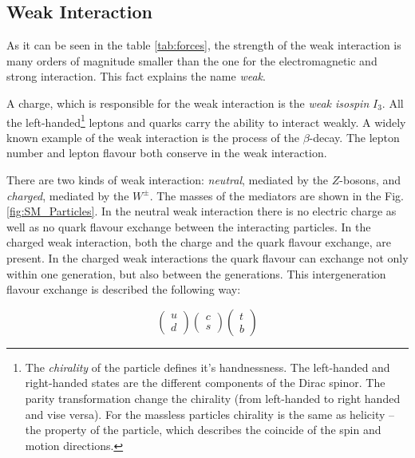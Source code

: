 \subsection{Weak Interaction}

As it can be seen in the table \ref{tab:forces}, the strength of the weak interaction is many orders of magnitude smaller than the one for the 
electromagnetic and strong interaction. This fact explains the name \textit{weak}.

A charge, which is responsible for the weak interaction is the \textit{weak isospin} $I_{3}$.
All the left-handed\footnote{The \textit{chirality} of the particle defines it's handnessness.
The left-handed and right-handed states are the different components of the Dirac spinor\cite{aitchison2003gauge}. The parity transformation change the chirality (from
left-handed to right handed and vise versa). For the massless particles chirality is the same as helicity -- the property of the particle, which describes the coincide
of the spin and motion directions.} leptons and quarks carry the ability to interact weakly.
A widely known example of the weak interaction is the process of the $\beta$-decay. The lepton number and lepton flavour both conserve in the weak interaction.

There are two kinds of weak interaction: \textit{neutral}, mediated by the 
$Z$-bosons, and \textit{charged}, mediated by the $W^{\pm}$. The masses of the 
mediators are shown in the Fig. \ref{fig:SM_Particles}.	In the neutral weak interaction there is no electric charge as well as no quark flavour exchange between the 
interacting particles. In the charged weak interaction, both the charge and the quark flavour exchange, are present. In the charged weak interactions 
the quark flavour can exchange not only within one generation, but also between the generations.
This intergeneration flavour exchange is described the following way:

\begin{equation}
\left( \begin{array}{c}
       u \\ d
      \end{array} \right)
\left( \begin{array}{c}
       c \\ s
      \end{array} \right)
\left( \begin{array}{c}
       t \\ b
      \end{array} \right)
\end{equation}
  
